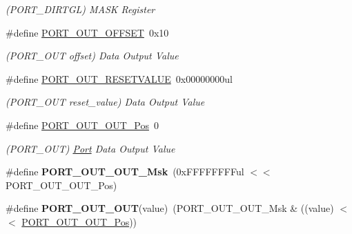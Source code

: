 \begin{DoxyCompactItemize}
\begin{DoxyCompactList}\small\item\em (P\+O\+R\+T\+\_\+\+D\+I\+R\+T\+G\+L) M\+A\+S\+K Register \end{DoxyCompactList}\item 
\hypertarget{group___s_a_m_l21___p_o_r_t_ga613c002dd1466d78b367184b2e8d5702}{}\#define \hyperlink{group___s_a_m_l21___p_o_r_t_ga613c002dd1466d78b367184b2e8d5702}{P\+O\+R\+T\+\_\+\+O\+U\+T\+\_\+\+O\+F\+F\+S\+E\+T}~0x10\label{group___s_a_m_l21___p_o_r_t_ga613c002dd1466d78b367184b2e8d5702}

\begin{DoxyCompactList}\small\item\em (P\+O\+R\+T\+\_\+\+O\+U\+T offset) Data Output Value \end{DoxyCompactList}\item 
\hypertarget{group___s_a_m_l21___p_o_r_t_gaf021492775d0fe23716f66e5ee65ef34}{}\#define \hyperlink{group___s_a_m_l21___p_o_r_t_gaf021492775d0fe23716f66e5ee65ef34}{P\+O\+R\+T\+\_\+\+O\+U\+T\+\_\+\+R\+E\+S\+E\+T\+V\+A\+L\+U\+E}~0x00000000ul\label{group___s_a_m_l21___p_o_r_t_gaf021492775d0fe23716f66e5ee65ef34}

\begin{DoxyCompactList}\small\item\em (P\+O\+R\+T\+\_\+\+O\+U\+T reset\+\_\+value) Data Output Value \end{DoxyCompactList}\item 
\hypertarget{group___s_a_m_l21___p_o_r_t_ga2311d33aa22995c6371e1a7f8fbf4b8b}{}\#define \hyperlink{group___s_a_m_l21___p_o_r_t_ga2311d33aa22995c6371e1a7f8fbf4b8b}{P\+O\+R\+T\+\_\+\+O\+U\+T\+\_\+\+O\+U\+T\+\_\+\+Pos}~0\label{group___s_a_m_l21___p_o_r_t_ga2311d33aa22995c6371e1a7f8fbf4b8b}

\begin{DoxyCompactList}\small\item\em (P\+O\+R\+T\+\_\+\+O\+U\+T) \hyperlink{struct_port}{Port} Data Output Value \end{DoxyCompactList}\item 
\hypertarget{group___s_a_m_l21___p_o_r_t_ga9c23adb5d24fc6e1b2f4eeaa5b14bfa6}{}\#define {\bfseries P\+O\+R\+T\+\_\+\+O\+U\+T\+\_\+\+O\+U\+T\+\_\+\+Msk}~(0x\+F\+F\+F\+F\+F\+F\+F\+Ful $<$$<$ P\+O\+R\+T\+\_\+\+O\+U\+T\+\_\+\+O\+U\+T\+\_\+\+Pos)\label{group___s_a_m_l21___p_o_r_t_ga9c23adb5d24fc6e1b2f4eeaa5b14bfa6}

\item 
\hypertarget{group___s_a_m_l21___p_o_r_t_ga089cc4f40a2dbf3abb393017317fdf5d}{}\#define {\bfseries P\+O\+R\+T\+\_\+\+O\+U\+T\+\_\+\+O\+U\+T}(value)~(P\+O\+R\+T\+\_\+\+O\+U\+T\+\_\+\+O\+U\+T\+\_\+\+Msk \& ((value) $<$$<$ \hyperlink{group___s_a_m_l21___p_o_r_t_ga2311d33aa22995c6371e1a7f8fbf4b8b}{P\+O\+R\+T\+\_\+\+O\+U\+T\+\_\+\+O\+U\+T\+\_\+\+Pos}))\label{group___s_a_m_l21___p_o_r_t_ga089cc4f40a2dbf3abb393017317fdf5d}


\end{DoxyCompactItemize}

